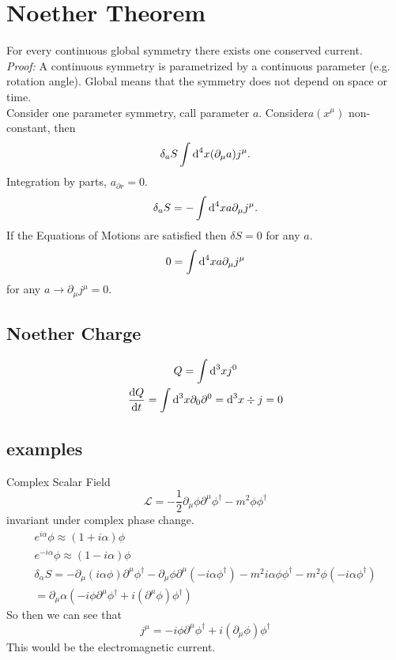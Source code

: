 \section{Noether Theorem}
For every continuous global symmetry there exists one conserved current.\\
\textit{Proof: } A continuous symmetry is parametrized by a continuous parameter (e.g. rotation angle). Global means that the symmetry does not depend on space or time.\\
Consider one parameter symmetry, call parameter $a$. Consider$a(x^\mu)$ non-constant, then
$$
\delta_a S \int \text d^4x (\partial_\mu a)j^\mu.
$$
Integration by parts, $a_{\partial r}=0$.
$$
\delta_a S = -\int \text d^4x a\partial_\mu j^\mu.
$$
If the Equations of Motions are satisfied then $\delta S = 0$ for any $a$.
$$
0 = \int \text d^4x a\partial_\mu j^\mu
$$
for any $a \rightarrow \partial_\mu j^\mu = 0$.

\subsection{Noether Charge}
\begin{gather}
	Q = \int \text d^3x j^0\\
	\frac{\text dQ}{\text dt} = \int \text d^3x \partial_0\partial^0 = \text d^3x \div j = 0
\end{gather}

\subsection{examples}
Complex Scalar Field
\begin{equation}
	\mathcal L = -\frac{1}{2}\partial_\mu \phi \partial^\mu \phi^\dagger - m^2 \phi\phi^\dagger
\end{equation}
invariant under complex phase change.
\begin{gather}
	e^{i\alpha}\phi \approx (1+i\alpha)\phi\\
	e^{-i\alpha}\phi \approx (1-i\alpha)\phi\\
	\delta_\alpha S = -\partial_\mu(i\alpha\phi)\partial^\mu\phi^\dagger - \partial_\mu\phi\partial^\mu(-i\alpha\phi^\dagger) - m^2i\alpha\phi\phi^\dagger - m^2\phi(-i\alpha\phi^\dagger)\\
	= \partial_\mu\alpha\left(-i\phi\partial^\mu\phi^\dagger + i(\partial^\mu\phi) \phi^\dagger\right)
\end{gather}
So then we can see that
\begin{equation}
	j^\mu = -i\phi\partial^\mu\phi^\dagger + i(\partial_\mu \phi)\phi^\dagger
\end{equation}
This would be the electromagnetic current.

